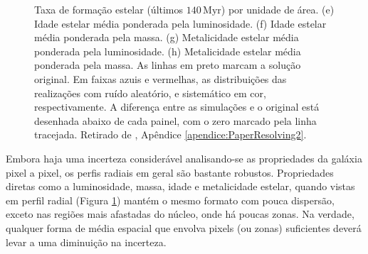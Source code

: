 \begin{figure}
{	Taxa de formação estelar (últimos $140\, \mathrm{Myr}$) por unidade de área.
	(e) Idade estelar média ponderada pela luminosidade. (f) Idade estelar média
	ponderada pela massa. (g) Metalicidade estelar média ponderada pela
	luminosidade. (h) Metalicidade estelar média ponderada pela massa. As
	linhas em preto marcam a solução original. Em faixas azuis e vermelhas, as
	distribuições das realizações com ruído aleatório, e sistemático em cor,
	respectivamente. A diferença entre as simulações e o original está desenhada
	abaixo de cada painel, com o zero marcado pela linha tracejada. Retirado de
	\cite[figura 4]{CidFernandes2013b}, Apêndice \ref{apendice:PaperResolving2}.}
	\label{fig:incertRad}
\end{figure}

Embora haja uma incerteza considerável analisando-se as propriedades da galáxia
pixel a pixel, os perfis radiais em geral são bastante robustos. Propriedades
diretas como a luminosidade, massa, idade e metalicidade estelar, quando vistas
em perfil radial (Figura \ref{fig:incertRad}) mantém o mesmo formato com pouca
dispersão, exceto nas regiões mais afastadas do núcleo, onde há poucas zonas. Na
verdade, qualquer forma de média espacial que envolva pixels (ou zonas)
suficientes deverá levar a uma diminuição na incerteza.

